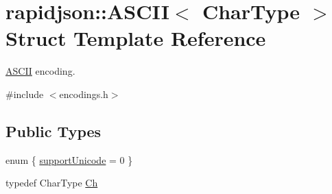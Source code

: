 \hypertarget{structrapidjson_1_1_a_s_c_i_i}{}\section{rapidjson\+::A\+S\+C\+II$<$ Char\+Type $>$ Struct Template Reference}
\label{structrapidjson_1_1_a_s_c_i_i}


\mbox{\hyperlink{structrapidjson_1_1_a_s_c_i_i}{A\+S\+C\+II}} encoding.  




{\ttfamily \#include $<$encodings.\+h$>$}

\subsection*{Public Types}
\begin{DoxyCompactItemize}
\item 
enum \{ \mbox{\hyperlink{structrapidjson_1_1_a_s_c_i_i_a598bb5f32c9f0c851529a9ded73db5eba7c8190ea4c25af669f952bfe200afeee}{support\+Unicode}} = 0
 \}
\item 
typedef Char\+Type \mbox{\hyperlink{structrapidjson_1_1_a_s_c_i_i_a2c1e49f42921027d58f1125a627cc5e5}{Ch}}
\end{DoxyCompactItemize}
